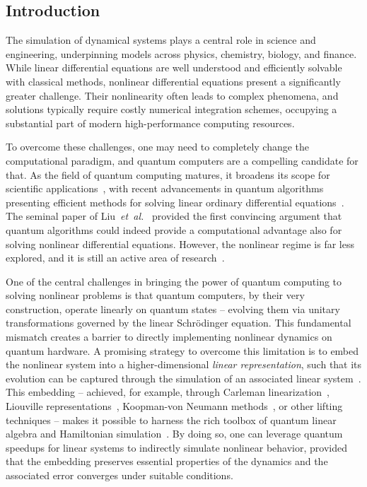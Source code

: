 \documentclass[superscriptaddress,onecolumn,nofootinbib,longbibliography,a4paper,accepted=2026-09-29]{quantumarticle}
\theoremstyle{plain}
\theoremstyle{definition}
\numberwithin{thm}{section}
\numberwithin{assumption}{section}
\numberwithin{lemma}{section}
\numberwithin{prop}{section}
\numberwithin{cor}{section}
\numberwithin{definition}{section}
\numberwithin{rmk}{section}
\numberwithin{equation}{section}
\begin{document}
\subsection{Introduction}

The simulation of dynamical systems plays a central role in science and engineering, underpinning models across physics, chemistry, biology, and finance. While linear differential equations are well understood and efficiently solvable with classical methods, nonlinear differential equations present a significantly greater challenge. Their nonlinearity often leads to complex phenomena, and solutions typically require costly numerical integration schemes, occupying a substantial part of modern high-performance computing resources.

To overcome these challenges, one may need to completely change the computational paradigm, and quantum computers are a compelling candidate for that. As the field of quantum computing matures, it broadens its scope for scientific applications~\cite{lin2022lecture}, with recent advancements in quantum algorithms presenting efficient methods for solving linear ordinary differential equations~\cite{berry2014high,berry2017quantum,berry2024quantum,an2023linear,an2023quantum,jennings2023cost}. The seminal paper of Liu~\textit{et~al.}~\cite{liu2021efficient} provided the first convincing argument that quantum algorithms could indeed provide a computational advantage also for solving nonlinear differential equations. However, the nonlinear regime is far less explored, and it is still an active area of research~\cite{surana2022efficient,costa2023further,krovi2023improved,liu2023efficient, javier2025quantum}.

One of the central challenges in bringing the power of quantum computing to solving nonlinear problems is that quantum computers, by their very construction, operate linearly on quantum states -- evolving them via unitary transformations governed by the linear Schr\"{o}dinger equation. This fundamental mismatch creates a barrier to directly implementing nonlinear dynamics on quantum hardware. A promising strategy to overcome this limitation is to embed the nonlinear system into a higher-dimensional \emph{linear representation}, such that its evolution can be captured through the simulation of an associated linear system~\cite{engel2021linear,lin2022challenges}. This embedding -- achieved, for example, through Carleman linearization~\cite{Carleman32}, Liouville representations~\cite{lin2022challenges}, Koopman-von Neumann methods~\cite{joseph2020koopman}, or other lifting techniques  -- makes it possible to harness the rich toolbox of quantum linear algebra and Hamiltonian simulation~\cite{lin2022lecture}. By doing so, one can leverage quantum speedups for linear systems to indirectly simulate nonlinear behavior, provided that the embedding preserves essential properties of the dynamics and the associated error converges under suitable conditions.
\end{document}
